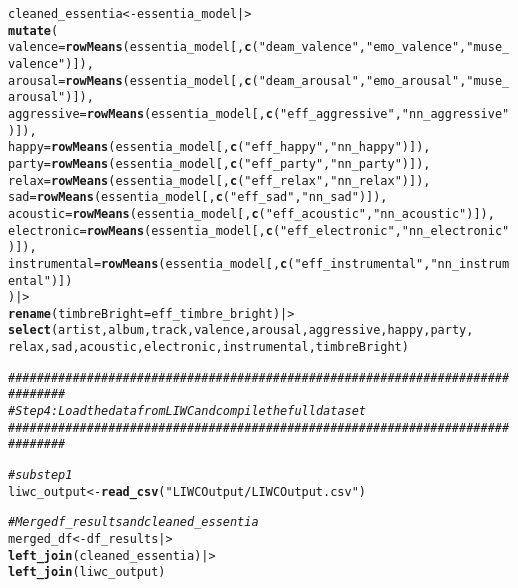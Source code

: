 \documentclass{article}\usepackage[]{graphicx}\usepackage[]{xcolor}
\makeatletter
\newcommand{\hlsng}[1]{\textcolor[rgb]{0.192,0.494,0.8}{#1}}%
\newcommand{\hlcom}[1]{\textcolor[rgb]{0.678,0.584,0.686}{\textit{#1}}}%
\newcommand{\hldef}[1]{\textcolor[rgb]{0.345,0.345,0.345}{#1}}%
\newcommand{\hlkwb}[1]{\textcolor[rgb]{0.69,0.353,0.396}{#1}}%
\newcommand{\hlkwc}[1]{\textcolor[rgb]{0.333,0.667,0.333}{#1}}%
\newcommand{\hlkwd}[1]{\textcolor[rgb]{0.737,0.353,0.396}{\textbf{#1}}}%
\newenvironment{kframe}{%
 \def\at@end@of@kframe{}%
 \ifinner\ifhmode%
  \def\at@end@of@kframe{\end{minipage}}%
  \begin{minipage}{\columnwidth}%
 \fi\fi%
 \def\FrameCommand##1{\hskip\@totalleftmargin \hskip-\fboxsep
 \colorbox{shadecolor}{##1}\hskip-\fboxsep
     \hskip-\linewidth \hskip-\@totalleftmargin \hskip\columnwidth}%
 \MakeFramed {\advance\hsize-\width
   \@totalleftmargin\z@ \linewidth\hsize
   \@setminipage}}%
 {\par\unskip\endMakeFramed%
 \at@end@of@kframe}
\newenvironment{knitrout}{}{} %
\makeatother
\begin{document}
\begin{enumerate}
\begin{knitrout}
\begin{kframe}
\begin{alltt}
\hldef{cleaned_essentia} \hlkwb{<-} \hldef{essentia_model |>}
  \hlkwd{mutate}\hldef{(}
    \hlkwc{valence} \hldef{=} \hlkwd{rowMeans}\hldef{(essentia_model[,}\hlkwd{c}\hldef{(}\hlsng{"deam_valence"}\hldef{,} \hlsng{"emo_valence"}\hldef{,} \hlsng{"muse_valence"}\hldef{)]),}
    \hlkwc{arousal} \hldef{=} \hlkwd{rowMeans}\hldef{(essentia_model[ ,} \hlkwd{c}\hldef{(}\hlsng{"deam_arousal"}\hldef{,} \hlsng{"emo_arousal"}\hldef{,} \hlsng{"muse_arousal"}\hldef{)]),}
    \hlkwc{aggressive} \hldef{=} \hlkwd{rowMeans}\hldef{(essentia_model[,}\hlkwd{c}\hldef{(}\hlsng{"eff_aggressive"}\hldef{,} \hlsng{"nn_aggressive"}\hldef{)]),}
    \hlkwc{happy} \hldef{=} \hlkwd{rowMeans}\hldef{(essentia_model[,}\hlkwd{c}\hldef{(}\hlsng{"eff_happy"}\hldef{,} \hlsng{"nn_happy"}\hldef{)]),}
    \hlkwc{party} \hldef{=} \hlkwd{rowMeans}\hldef{(essentia_model[,}\hlkwd{c}\hldef{(}\hlsng{"eff_party"}\hldef{,} \hlsng{"nn_party"}\hldef{)]),}
    \hlkwc{relax} \hldef{=} \hlkwd{rowMeans}\hldef{(essentia_model[,}\hlkwd{c}\hldef{(}\hlsng{"eff_relax"}\hldef{,} \hlsng{"nn_relax"}\hldef{)]),}
    \hlkwc{sad} \hldef{=} \hlkwd{rowMeans}\hldef{(essentia_model[,}\hlkwd{c}\hldef{(}\hlsng{"eff_sad"}\hldef{,} \hlsng{"nn_sad"}\hldef{)]),}
    \hlkwc{acoustic} \hldef{=} \hlkwd{rowMeans}\hldef{(essentia_model[,}\hlkwd{c}\hldef{(}\hlsng{"eff_acoustic"}\hldef{,} \hlsng{"nn_acoustic"}\hldef{)]),}
    \hlkwc{electronic} \hldef{=} \hlkwd{rowMeans}\hldef{(essentia_model[,}\hlkwd{c}\hldef{(}\hlsng{"eff_electronic"}\hldef{,} \hlsng{"nn_electronic"}\hldef{)]),}
    \hlkwc{instrumental} \hldef{=} \hlkwd{rowMeans}\hldef{(essentia_model[,}\hlkwd{c}\hldef{(}\hlsng{"eff_instrumental"}\hldef{,} \hlsng{"nn_instrumental"}\hldef{)])}
  \hldef{) |>}
  \hlkwd{rename}\hldef{(}\hlkwc{timbreBright} \hldef{= eff_timbre_bright) |>}
  \hlkwd{select}\hldef{(artist, album, track, valence, arousal, aggressive, happy, party,}
         \hldef{relax, sad, acoustic, electronic, instrumental, timbreBright)}

\hlcom{##############################################################################}
\hlcom{# Step 4: Load the data from LIWC and compile the full dataset}
\hlcom{##############################################################################}

\hlcom{#substep 1}
\hldef{liwc_output} \hlkwb{<-} \hlkwd{read_csv}\hldef{(}\hlsng{"LIWCOutput/LIWCOutput.csv"}\hldef{)}

\hlcom{# Merge df_results and cleaned_essentia}
\hldef{merged_df} \hlkwb{<-} \hldef{df_results |>}
  \hlkwd{left_join}\hldef{(cleaned_essentia) |>}
  \hlkwd{left_join}\hldef{(liwc_output)}


\end{alltt}
\end{kframe}
\end{knitrout}
\end{enumerate}
\end{document}
